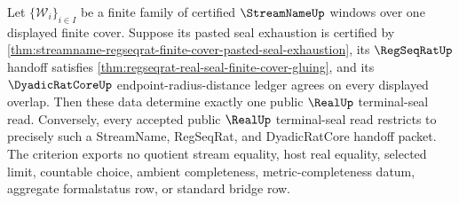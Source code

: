 \begin{theorem}
\label{thm:real-terminal-seal-streamname-regseqrat-handoff-exactness}
Let $\{\mathcal W_i\}_{i\in I}$ be a finite family of certified
$\StreamNameUp$ windows over one displayed finite cover. Suppose its pasted
seal exhaustion is certified by
\autoref{thm:streamname-regseqrat-finite-cover-pasted-seal-exhaustion}, its
$\RegSeqRatUp$ handoff satisfies
\autoref{thm:regseqrat-real-seal-finite-cover-gluing}, and its
$\DyadicRatCoreUp$ endpoint-radius-distance ledger agrees on every displayed
overlap. Then these data determine exactly one public $\RealUp$
terminal-seal read. Conversely, every accepted public $\RealUp$ terminal-seal
read restricts to precisely such a StreamName, RegSeqRat, and DyadicRatCore
handoff packet. The criterion exports no quotient stream equality, host real
equality, selected limit, countable choice, ambient completeness,
metric-completeness datum, aggregate formalstatus row, or standard bridge row.
\end{theorem}
